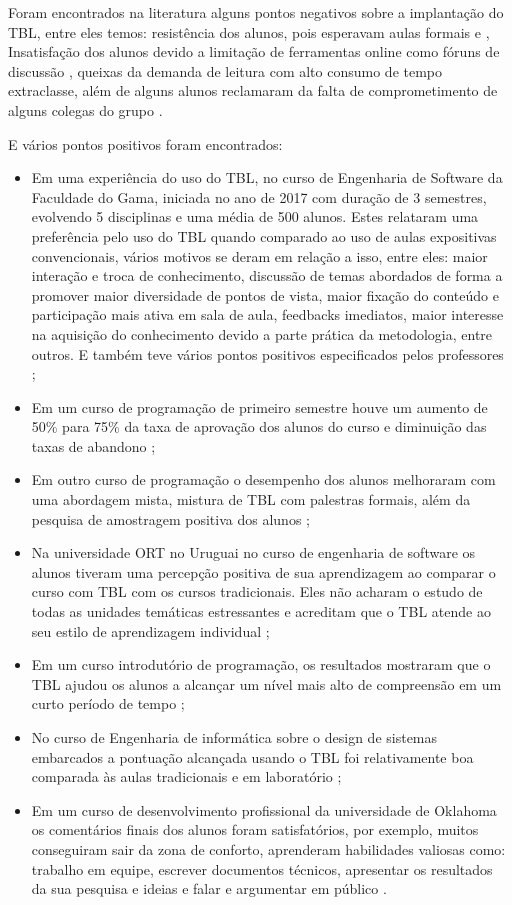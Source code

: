 Foram encontrados na literatura alguns pontos negativos sobre a implantação do TBL, entre eles temos: resistência dos alunos, pois esperavam aulas formais \cite{davis} e \cite{matalonga}, Insatisfação dos alunos devido a limitação de ferramentas online como fóruns de discussão \cite{awatramani}, queixas da demanda de leitura com alto consumo de tempo extraclasse, além de alguns alunos reclamaram da falta de comprometimento de alguns colegas do grupo \cite{ramos}.

E vários pontos positivos foram encontrados:

\begin{itemize}
  \item Em uma experiência do uso do TBL, no curso de Engenharia de Software da Faculdade do Gama, iniciada no ano de 2017 com duração de 3 semestres, evolvendo 5 disciplinas e uma média de 500 alunos. Estes relataram uma preferência pelo uso do TBL quando comparado ao uso de aulas expositivas convencionais, vários motivos se deram em relação a isso, entre eles: maior interação e troca de conhecimento, discussão de temas abordados de forma a promover maior diversidade de pontos de vista, maior fixação do conteúdo e participação mais ativa em sala de aula, feedbacks imediatos, maior interesse na aquisição do conhecimento devido a parte prática da metodologia, entre outros. E também teve vários pontos positivos especificados pelos professores \cite{ramos};
  \item Em um curso de programação de primeiro semestre houve um aumento de 50\% para 75\% da taxa de aprovação dos alunos do curso e diminuição das taxas de abandono \cite{matalonga};
  \item Em outro curso de programação o desempenho dos alunos melhoraram com uma abordagem mista, mistura de TBL com palestras formais, além da pesquisa de amostragem positiva dos alunos \cite{elnagar};
  \item Na universidade ORT no Uruguai no curso de engenharia de software os alunos tiveram uma percepção positiva de sua aprendizagem ao comparar o curso com TBL com os cursos tradicionais. Eles não acharam o estudo de todas as unidades temáticas estressantes e acreditam que o TBL atende ao seu estilo de aprendizagem individual \cite{matalonga};
  \item Em um curso introdutório de programação, os resultados mostraram que o TBL ajudou os alunos a alcançar um nível
    mais alto de compreensão em um curto período de tempo \cite{cabrera};
  \item No curso de Engenharia de informática sobre o design de sistemas embarcados a pontuação alcançada usando o TBL foi relativamente boa comparada às aulas tradicionais e em laboratório \cite{awatramani};
  \item Em um curso de desenvolvimento profissional da universidade de Oklahoma os comentários finais dos alunos foram satisfatórios, por exemplo, muitos conseguiram sair da zona de conforto, aprenderam habilidades valiosas como: trabalho em equipe, escrever documentos técnicos, apresentar os resultados da sua pesquisa e ideias e falar e argumentar em público \cite{davis}.
\end{itemize}

